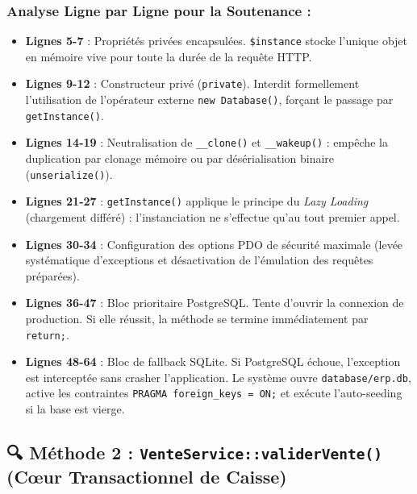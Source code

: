 \documentclass[11pt,a4paper,titlepage,twoside,openright]{report}
\begin{document}
\subsubsection{Analyse Ligne par Ligne pour la Soutenance :}
\begin{itemize}
    \item \textbf{Lignes 5-7} : Propriétés privées encapsulées. \texttt{\$instance} stocke l'unique objet en mémoire vive pour toute la durée de la requête HTTP.
    \item \textbf{Lignes 9-12} : Constructeur privé (\texttt{private}). Interdit formellement l'utilisation de l'opérateur externe \texttt{new Database()}, forçant le passage par \texttt{getInstance()}.
    \item \textbf{Lignes 14-19} : Neutralisation de \texttt{\_\_clone()} et \texttt{\_\_wakeup()} : empêche la duplication par clonage mémoire ou par désérialisation binaire (\texttt{unserialize()}).
    \item \textbf{Lignes 21-27} : \texttt{getInstance()} applique le principe du \emph{Lazy Loading} (chargement différé) : l'instanciation ne s'effectue qu'au tout premier appel.
    \item \textbf{Lignes 30-34} : Configuration des options PDO de sécurité maximale (levée systématique d'exceptions et désactivation de l'émulation des requêtes préparées).
    \item \textbf{Lignes 36-47} : Bloc prioritaire PostgreSQL. Tente d'ouvrir la connexion de production. Si elle réussit, la méthode se termine immédiatement par \texttt{return;}.
    \item \textbf{Lignes 48-64} : Bloc de fallback SQLite. Si PostgreSQL échoue, l'exception est interceptée sans crasher l'application. Le système ouvre \texttt{database/erp.db}, active les contraintes \texttt{PRAGMA foreign\_keys = ON;} et exécute l'auto-seeding si la base est vierge.
\end{itemize}

\subsection{🔍 Méthode 2 : \texttt{VenteService::validerVente()} (Cœur Transactionnel de Caisse)}
\end{document}
